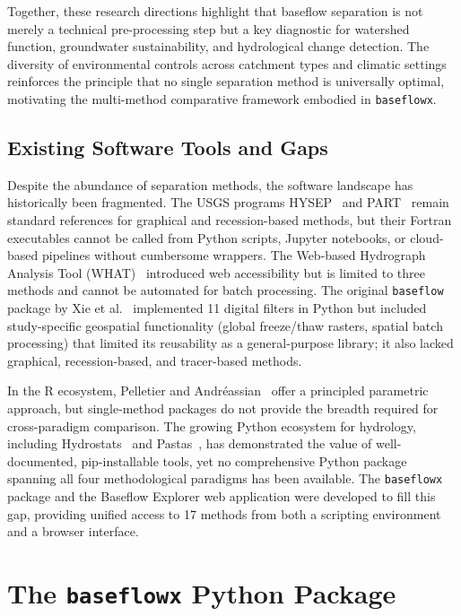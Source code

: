 \documentclass[hydrology,article,submit,pdftex,moreauthors]{Definitions/mdpi}
\begin{document}
Together, these research directions highlight that baseflow separation is not merely a technical pre-processing step but a key diagnostic for watershed function, groundwater sustainability, and hydrological change detection. The diversity of environmental controls across catchment types and climatic settings reinforces the principle that no single separation method is universally optimal, motivating the multi-method comparative framework embodied in \texttt{baseflowx}.

\subsection{Existing Software Tools and Gaps}
\label{sec:existing_tools}

Despite the abundance of separation methods, the software landscape has historically been fragmented. The USGS programs HYSEP~\cite{Sloto1996} and PART~\cite{Rutledge1998} remain standard references for graphical and recession-based methods, but their Fortran executables cannot be called from Python scripts, Jupyter notebooks, or cloud-based pipelines without cumbersome wrappers. The Web-based Hydrograph Analysis Tool (WHAT)~\cite{Lim2005} introduced web accessibility but is limited to three methods and cannot be automated for batch processing. The original \texttt{baseflow} package by Xie et al.~\cite{Xie2020} implemented 11 digital filters in Python but included study-specific geospatial functionality (global freeze/thaw rasters, spatial batch processing) that limited its reusability as a general-purpose library; it also lacked graphical, recession-based, and tracer-based methods.

In the R ecosystem, Pelletier and Andr\'{e}assian~\cite{Pelletier2020,PelletierR2020} offer a principled parametric approach, but single-method packages do not provide the breadth required for cross-paradigm comparison. The growing Python ecosystem for hydrology, including Hydrostats~\cite{Roberts2018} and Pastas~\cite{Collenteur2019}, has demonstrated the value of well-documented, pip-installable tools, yet no comprehensive Python package spanning all four methodological paradigms has been available. The \texttt{baseflowx} package and the Baseflow Explorer web application were developed to fill this gap, providing unified access to 17 methods from both a scripting environment and a browser interface.

\section{The \texttt{baseflowx} Python Package}
\label{sec:design}
\end{document}
